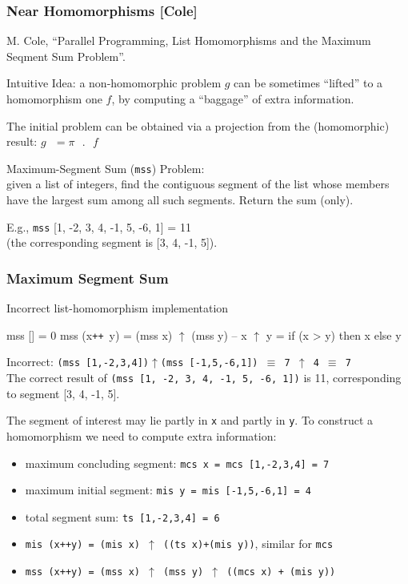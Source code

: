 \documentclass{beamer}
\renewcommand{\emph}[1]{\textcolor{structure}{#1}}
\newcommand{\emp}[1]{\textcolor{DikuRed}{ #1}}
\newcommand{\mymath}[1]{$ #1 $}
\begin{document}
\begin{frame}[fragile,t]
  \frametitle{Near Homomorphisms [Cole]}

\emp{M. Cole, ``Parallel Programming, List Homomorphisms and the Maximum Seqment Sum Problem''.} 
\bigskip

\emph{Intuitive Idea}: a non-homomorphic problem $g$ can be sometimes ``lifted'' to a 
homomorphism one $f$, by computing a ``baggage'' of extra information. 

\bigskip

The initial problem can be obtained via a projection from the (homomorphic) 
result: $g\mbox{ }=\pi\mbox{ }.\mbox{ }f$

\bigskip

\emp{Maximum-Segment Sum ({\tt mss}) Problem}: \\
given a list of integers, find the contiguous segment of the list 
whose members have the largest sum among all such segments. Return the sum (only).

\bigskip

E.g., {\tt mss} [1, -2, 3, 4, -1, 5, -6, 1] = 11 \\
(the corresponding segment is [3, 4, -1, 5]). 

\end{frame}


\begin{frame}[fragile,t]
  \frametitle{Maximum Segment Sum}

\begin{block}{Incorrect list-homomorphism implementation}
\begin{colorcode}
mss []       = 0
mss (x{\tt ++}\mbox{ }y) = (mss x) \mymath{\uparrow} (mss y) -- x \mymath{\uparrow} y = if (x > y) then x else y
\end{colorcode}
\end{block} 

\smallskip

\alert{Incorrect:} {\tt (mss [1,-2,3,4])\mymath{\uparrow}(mss [-1,5,-6,1]) $\equiv$ 7 \mymath{\uparrow} 4 $\equiv$ 7} \\
\emph{The correct result} of {\tt (mss [1, -2, 3, 4, -1, 5, -6, 1])} \emph{is} 11, corresponding to segment [3, 4, -1, 5].

\bigskip

\emph{The segment of interest may lie partly in {\tt x} and partly in {\tt y}.} 
To construct a homomorphism we need to compute extra information:\pause
\begin{itemize}
    \item maximum concluding segment: {\tt mcs x = mcs [1,-2,3,4] = 7}
    \item maximum initial segment: {\tt mis y = mis [-1,5,-6,1] = 4}
    \item total segment sum: {\tt ts [1,-2,3,4] = 6}\pause
    \item {\tt mis (x++y) = (mis x) $\uparrow$ ((ts x)+(mis y))}, similar for {\tt mcs}    
    \item {\tt mss (x++y) = (mss x) $\uparrow$ (mss y) $\uparrow$ ((mcs x) + (mis y))}
\end{itemize}
\end{frame}
\end{document}
